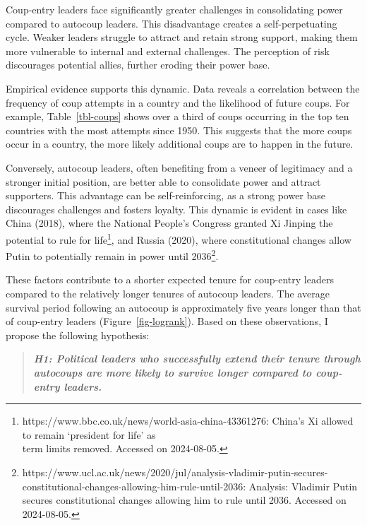 \documentclass[
  12pt,
]{report}
\begin{document}
\endgroup

Coup-entry leaders face significantly greater challenges in
consolidating power compared to autocoup leaders. This disadvantage
creates a self-perpetuating cycle. Weaker leaders struggle to attract
and retain strong support, making them more vulnerable to internal and
external challenges. The perception of risk discourages potential
allies, further eroding their power base.

Empirical evidence supports this dynamic. Data reveals a correlation
between the frequency of coup attempts in a country and the likelihood
of future coups. For example, Table~\ref{tbl-coups} shows over a third
of coups occurring in the top ten countries with the most attempts since
1950. This suggests that the more coups occur in a country, the more
likely additional coups are to happen in the future.

Conversely, autocoup leaders, often benefiting from a veneer of
legitimacy and a stronger initial position, are better able to
consolidate power and attract supporters. This advantage can be
self-reinforcing, as a strong power base discourages challenges and
fosters loyalty. This dynamic is evident in cases like China (2018),
where the National People's Congress granted Xi Jinping the potential to
rule for life\footnote{https://www.bbc.co.uk/news/world-asia-china-43361276:
  China's Xi allowed to remain `president for life' as\\
  term limits removed. Accessed on 2024-08-05.}, and Russia (2020),
where constitutional changes allow Putin to potentially remain in power
until 2036\footnote{https://www.ucl.ac.uk/news/2020/jul/analysis-vladimir-putin-secures-constitutional-changes-allowing-him-rule-until-2036:
  Analysis: Vladimir Putin secures constitutional changes allowing him
  to rule until 2036. Accessed on 2024-08-05.}.

These factors contribute to a shorter expected tenure for coup-entry
leaders compared to the relatively longer tenures of autocoup leaders.
The average survival period following an autocoup is approximately five
years longer than that of coup-entry leaders (Figure~\ref{fig-logrank}).
Based on these observations, I propose the following hypothesis:

\begin{quote}
\textbf{\emph{H1: Political leaders who successfully extend their tenure
through autocoups are more likely to survive longer compared to
coup-entry leaders.}}
\end{quote}
\end{document}
